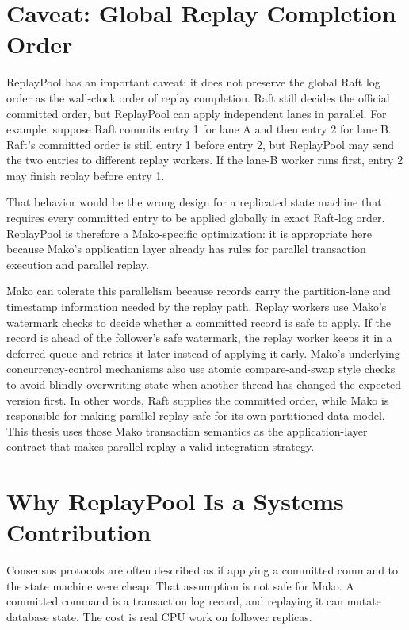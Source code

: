 \section{Caveat: Global Replay Completion Order}

ReplayPool has an important caveat: it does not preserve the global Raft log
order as the wall-clock order of replay completion. Raft still decides the
official committed order, but ReplayPool can apply independent lanes in
parallel. For example, suppose Raft commits entry 1 for lane A and then entry 2
for lane B. Raft's committed order is still entry 1 before entry 2, but
ReplayPool may send the two entries to different replay workers. If the lane-B
worker runs first, entry 2 may finish replay before entry 1.

That behavior would be the wrong design for a replicated state machine that
requires every committed entry to be applied globally in exact Raft-log order.
ReplayPool is therefore a Mako-specific optimization: it is appropriate here
because Mako's application layer already has rules for parallel transaction
execution and parallel replay.

Mako can tolerate this parallelism because records carry the partition-lane and
timestamp information needed by the replay path. Replay workers use Mako's
watermark checks to decide whether a committed record is safe to apply. If the
record is ahead of the follower's safe watermark, the replay worker keeps it in
a deferred queue and retries it later instead of applying it early. Mako's
underlying concurrency-control mechanisms also use atomic compare-and-swap
style checks to avoid blindly overwriting state when another thread has changed
the expected version first. In other words, Raft supplies the committed order,
while Mako is responsible for making parallel replay safe for its own
partitioned data model. This thesis uses those Mako transaction semantics as
the application-layer contract that makes parallel replay a valid integration
strategy.

\section{Why ReplayPool Is a Systems Contribution}

Consensus protocols are often described as if applying a committed command to
the state machine were cheap. That assumption is not safe for Mako. A committed
command is a transaction log record, and replaying it can mutate database
state. The cost is real CPU work on follower replicas.


